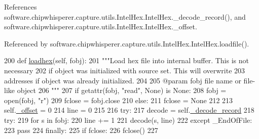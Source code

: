 References software.\+chipwhisperer.\+capture.\+utils.\+Intel\+Hex.\+Intel\+Hex.\+\_\+decode\+\_\+record(), and software.\+chipwhisperer.\+capture.\+utils.\+Intel\+Hex.\+Intel\+Hex.\+\_\+offset.



Referenced by software.\+chipwhisperer.\+capture.\+utils.\+Intel\+Hex.\+Intel\+Hex.\+loadfile().


\begin{DoxyCode}
200     \textcolor{keyword}{def }\hyperlink{classsoftware_1_1chipwhisperer_1_1capture_1_1utils_1_1IntelHex_1_1IntelHex_a775e8d95913df4a5ad79a59e7155f605}{loadhex}(self, fobj):
201         \textcolor{stringliteral}{"""Load hex file into internal buffer. This is not necessary}
202 \textcolor{stringliteral}{        if object was initialized with source set. This will overwrite}
203 \textcolor{stringliteral}{        addresses if object was already initialized.}
204 \textcolor{stringliteral}{}
205 \textcolor{stringliteral}{        @param  fobj        file name or file-like object}
206 \textcolor{stringliteral}{        """}
207         \textcolor{keywordflow}{if} getattr(fobj, \textcolor{stringliteral}{"read"}, \textcolor{keywordtype}{None}) \textcolor{keywordflow}{is} \textcolor{keywordtype}{None}:
208             fobj = open(fobj, \textcolor{stringliteral}{"}\textcolor{stringliteral}{r")}
209 \textcolor{stringliteral}{            fclose = fobj.close}
210 \textcolor{stringliteral}{        }\textcolor{keywordflow}{else}:
211             fclose = \textcolor{keywordtype}{None}
212 
213         self.\hyperlink{classsoftware_1_1chipwhisperer_1_1capture_1_1utils_1_1IntelHex_1_1IntelHex_ae76fa50a74ef63f6d385854c330203ef}{\_offset} = 0
214         line = 0
215 
216         \textcolor{keywordflow}{try}:
217             decode = self.\hyperlink{classsoftware_1_1chipwhisperer_1_1capture_1_1utils_1_1IntelHex_1_1IntelHex_a676ca5b64936c57e6688d0e6ecbc116d}{\_decode\_record}
218             \textcolor{keywordflow}{try}:
219                 \textcolor{keywordflow}{for} s \textcolor{keywordflow}{in} fobj:
220                     line += 1
221                     decode(s, line)
222             \textcolor{keywordflow}{except} \_EndOfFile:
223                 \textcolor{keywordflow}{pass}
224         \textcolor{keywordflow}{finally}:
225             \textcolor{keywordflow}{if} fclose:
226                 fclose()
227 
\end{DoxyCode}
\hypertarget{classsoftware_1_1chipwhisperer_1_1capture_1_1utils_1_1IntelHex_1_1IntelHex_aee2c8b04d227d7fe36ffe916c7b85650}{}
